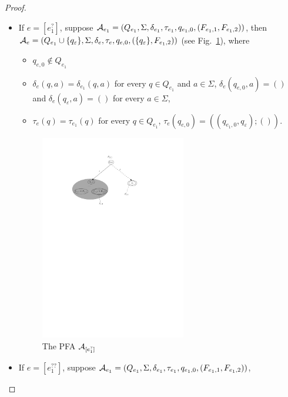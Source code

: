 \begin{proof}
\begin{itemize}
        \item If $e = [e_1^?]$, suppose $\mathcal{A}_{e_1} = (Q_{e_1},
            \Sigma, \delta_{e_1}, \tau_{e_1}, q_{e_1,0}, (F_{e_1,1}, F_{e_1,2}))$, 
            then $\mathcal{A}_e = (Q_{e_1} \cup \{q_{\varepsilon}\}, \Sigma,
            \delta_e, \tau_e, q_{e,0}, (\{q_{\varepsilon}\}, F_{e_1,2}))$ (see Fig.~\ref{fig-reg2pfa-6}), where  
            \begin{itemize}
                \item $q_{e,0}  \not \in Q_{e_1}$
                \item $\delta_e(q, a) = \delta_{e_1}(q, a)$ for every $q \in Q_{e_1}$ and $a \in \Sigma$, $\delta_e(q_{e,0}, a)  = ()$ and $\delta_e(q_{\varepsilon}, a) = ()$ for every $a \in \Sigma$, 
                \item $\tau_e(q) = \tau_{e_1}(q)$ for every $q \in Q_{e_1}$, $\tau_e(q_{e,0}) = ((q_{e_1,0},q_{\varepsilon}); ())$.
            \end{itemize}
            \begin{figure}[ht]
                \centering
                \includegraphics[width = 0.6\textwidth]{reg2pfa-6.pdf}
                \caption{The PFA $\mathcal{A}_{[e_1^?]}$}
                \label{fig-reg2pfa-6}
            \end{figure}
        \item If $e = [e_1^{??}]$, suppose $\mathcal{A}_{e_1} = (Q_{e_1},
            \Sigma, \delta_{e_1}, \tau_{e_1}, q_{e_1,0}, (F_{e_1,1}, F_{e_1,2}))$, 

\end{itemize}
\end{proof}
